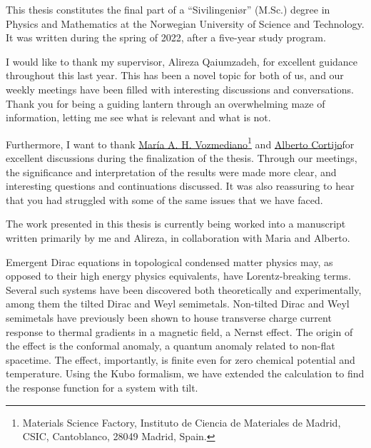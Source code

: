 This thesis constitutes the final part of a ``Sivilingeniør'' (M.Sc.) degree in Physics and Mathematics at the Norwegian University of Science and Technology.
It was written during the spring of 2022, after a five-year study program.

I would like to thank my supervisor, Alireza Qaiumzadeh, for excellent guidance throughout this last year.
This has been a novel topic for both of us, and our weekly meetings have been filled with interesting discussions and conversations.
Thank you for being a guiding lantern through an overwhelming maze of information, letting me see what is relevant and what is not.

Furthermore, I want to thank
\href{https://wp.icmm.csic.es/field-theories-in-condensed-matter-physics/vozmediano/}{María A. H. Vozmediano}\footnote{Materials Science Factory, Instituto de Ciencia de Materiales de Madrid, CSIC, Cantoblanco, 28049 Madrid, Spain\label{address-of-spain}.}
and
\href{https://wp.icmm.csic.es/field-theories-in-condensed-matter-physics/alberto-cortijo/}{Alberto Cortijo}\footnotemark[1]
for excellent discussions during the finalization of the thesis.
Through our meetings, the significance and interpretation of the results were made more clear, and interesting questions and continuations discussed.
It was also reassuring to hear that you had struggled with some of the same issues that we have faced.

The work presented in this thesis is currently being worked into a manuscript written primarily by me and Alireza, in collaboration with Maria and Alberto.

Emergent Dirac equations in topological condensed matter physics may, as opposed to their high energy physics equivalents, have Lorentz-breaking terms.
Several such systems have been discovered both theoretically and experimentally, among them the tilted Dirac and Weyl semimetals.
Non-tilted Dirac and Weyl semimetals have previously been shown to house transverse charge current response to thermal gradients in a magnetic field, a Nernst effect.
The origin of the effect is the conformal anomaly, a quantum anomaly related to non-flat spacetime.
The effect, importantly, is finite even for zero chemical potential and temperature.
Using the Kubo formalism, we have extended the calculation to find the response function for a system with tilt.

